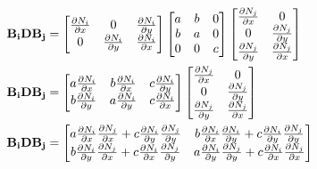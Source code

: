 \begin{equation}
	\begin{split}
&\mathbf{B_i} \mathbf{D} \mathbf{B_j}
	=
	\begin{bmatrix}
		\mdp{N_i}{x} & 0             & \mdp{N_i}{y}\\ 
		0            & \mdp{N_i}{y}  & \mdp{N_i}{x}
	\end{bmatrix}
	\begin{bmatrix}
		a & b& 0\\ 
		b & a& 0\\ 
		0 & 0& c\\ 
	\end{bmatrix}
	\begin{bmatrix}
	\mdp{N_j}{x} & 0\\ 
	0            & \mdp{N_j}{y}\\
 	\mdp{N_j}{y} & \mdp{N_j}{x}
	\end{bmatrix}\\
&\mathbf{B_i} \mathbf{D} \mathbf{B_j}
	=
	\begin{bmatrix}
		a \mdp{N_i}{x} & 	b \mdp{N_i}{x} & c \mdp{N_i}{y}\\ 
		b \mdp{N_i}{y} & 	a \mdp{N_i}{y} & c \mdp{N_i}{x}
	\end{bmatrix}
	\begin{bmatrix}
		\mdp{N_j}{x} & 0\\ 
		0            & \mdp{N_j}{y}\\
		\mdp{N_j}{y} & \mdp{N_j}{x}
	\end{bmatrix}\\
&\mathbf{B_i} \mathbf{D} \mathbf{B_j}
=
\begin{bmatrix}
	a \mdp{N_i}{x}\mdp{N_j}{x} + c \mdp{N_i}{y}\mdp{N_j}{y} & 	b \mdp{N_i}{x}\mdp{N_i}{y} + c \mdp{N_i}{y}\mdp{N_j}{y}\\ 
	b \mdp{N_i}{y}\mdp{N_j}{x} + c \mdp{N_i}{x}\mdp{N_j}{y} & 	a \mdp{N_i}{y}\mdp{N_j}{y} + c \mdp{N_i}{x}\mdp{N_j}{x}
\end{bmatrix}
\end{split}
\end{equation}

